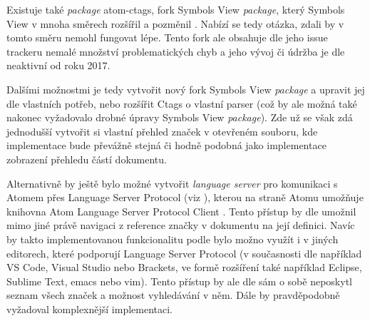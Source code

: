 Existuje také \textit{package} atom-ctags, fork Symbols View \textit{package}, který Symbols View v mnoha směrech
rozšířil a pozměnil \cite{atom-package-atom-ctags-github}. Nabízí se tedy otázka, zdali by v tomto směru nemohl fungovat
lépe. Tento fork ale obsahuje dle jeho issue trackeru \cite{atom-package-atom-ctags-github} nemalé množství
problematických chyb a jeho vývoj či údržba je dle \cite{atom-package-atom-ctags-github} neaktivní od roku 2017.

\begin{sloppypar}
Dalšími možnostmi je tedy vytvořit nový fork Symbols View \textit{package} a upravit jej dle vlastních potřeb, nebo
rozšířit Ctags o vlastní parser (což by ale možná také nakonec vyžadovalo drobné úpravy Symbols View \textit{package}).
Zde už se však zdá jednodušší vytvořit si vlastní přehled značek v otevřeném souboru, kde implementace bude převážně
stejná či hodně podobná jako implementace zobrazení přehledu částí dokumentu.
\end{sloppypar}

Alternativně by ještě bylo možné vytvořit \textit{language server} pro komunikaci s Atomem přes Language Server
Protocol (viz \cite{lsp-docs}), kterou na straně Atomu umožňuje knihovna Atom Language Server Protocol Client
\cite{atom-lsp-client-github}. Tento přístup by dle \cite{atom-lsp-client-github} umožnil mimo jiné právě navigaci z
reference značky v dokumentu na její definici. Navíc by takto implementovanou funkcionalitu podle \cite{lsp-docs} bylo
možno využít i v jiných editorech, které podporují Language Server Protocol (v současnosti dle \cite{lsp-docs} například
VS Code, Visual Studio nebo Brackets, ve formě rozšíření také například Eclipse, Sublime Text, emacs nebo vim). Tento
přístup by ale dle \cite{atom-lsp-client-github} sám o sobě neposkytl seznam všech značek a možnost vyhledávání v něm.
Dále by pravděpodobně vyžadoval komplexnější implementaci.
